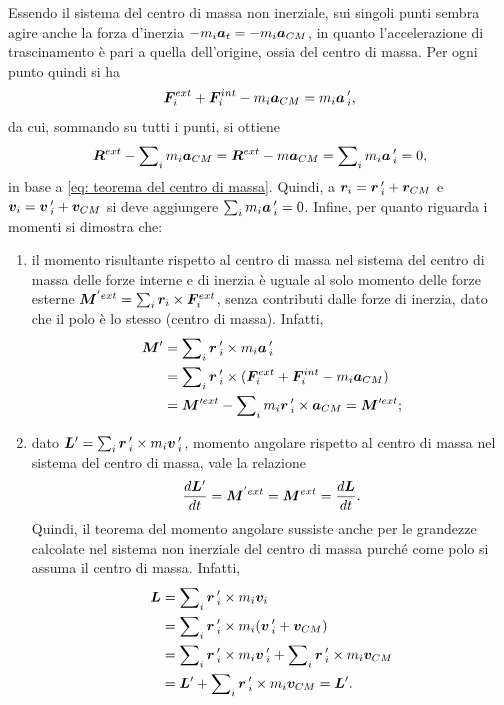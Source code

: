 Essendo il sistema del centro di massa non inerziale, sui singoli punti sembra agire anche la forza d'inerzia $-m_i\bm{a}_t=-m_i\bm{a}_{CM}$, in quanto l'accelerazione di trascinamento è pari a quella dell'origine, ossia del centro di massa. Per ogni punto quindi si ha
\begin{equation}
    \bm{F}_i^{ext}+\bm{F}_i^{int}-m_i\bm{a}_{CM}=m_i\bm{a}\,'_i,
\end{equation}
da cui, sommando su tutti i punti, si ottiene
\begin{equation}
    \bm{R}^{ext}-\sum\nolimits_im_i\bm{a}_{CM}=\bm{R}^{ext}-m\bm{a}_{CM}=\sum\nolimits_im_i\bm{a}\,'_i=0,
\end{equation}
in base a \eqref{eq: teorema del centro di massa}. Quindi, a $\bm{r}_i=\bm{r}\,'_i+\bm{r}_{CM}$ e $\bm{v}_i=\bm{v}\,'_i+\bm{v}_{CM}$ si deve aggiungere $\sum\nolimits_im_i\bm{a}\,'_i=0$. 
\newpage
\noindent
Infine, per quanto riguarda i momenti si dimostra che:
\begin{enumerate}
    \item il momento risultante rispetto al centro di massa nel sistema del centro di massa delle forze interne e di inerzia è uguale al solo momento delle forze esterne $\bm{M}^{'ext}=\sum_i\bm{r}_i\times\bm{F}_i^{ext}$, senza contributi dalle forze di inerzia, dato che il polo è lo stesso (centro di massa). Infatti,
    \begin{equation}
        \begin{split}
            \bm{M}'&=\sum\nolimits_i\bm{r}\,'_i\times m_i\bm{a}\,'_i \\
            &=\sum\nolimits_i\bm{r}\,'_i\times(\bm{F}_i^{ext}+\bm{F}_i^{int}-m_i\bm{a}_{CM}) \\
            &=\bm{M}'^{ext}-\sum\nolimits_im_i\bm{r}\,'_i\times\bm{a}_{CM}=\bm{M}'^{ext};
        \end{split}
    \end{equation}
    \item dato $\bm{L}'=\sum_i\bm{r}\,'_i\times m_i\bm{v}\,'_i$, momento angolare rispetto al centro di massa nel sistema del centro di massa, vale la relazione
    \begin{equation}
        \frac{d\bm{L}'}{dt}=\bm{M}^{'ext}=\bm{M}^{ext}=\frac{d\bm{L}}{dt}.
    \end{equation}
    Quindi, il teorema del momento angolare sussiste anche per le grandezze calcolate nel sistema non inerziale del centro di massa purché come polo si assuma il centro di massa. Infatti,
    \begin{equation}
        \begin{split}
            \bm{L}&=\sum\nolimits_i\bm{r}\,'_i\times m_i\bm{v}_i \\
            &=\sum\nolimits_i\bm{r}\,'_i\times m_i(\bm{v}\,'_i+\bm{v}_{CM}) \\
            &=\sum\nolimits_i\bm{r}\,'_i\times m_i\bm{v}\,'_i+\sum\nolimits_i\bm{r}\,'_i\times m_i\bm{v}_{CM} \\
            &=\bm{L}'+\sum\nolimits_i\bm{r}\,'_i\times m_i\bm{v}_{CM} =\bm{L}'.
        \end{split}
    \end{equation}
\end{enumerate}

